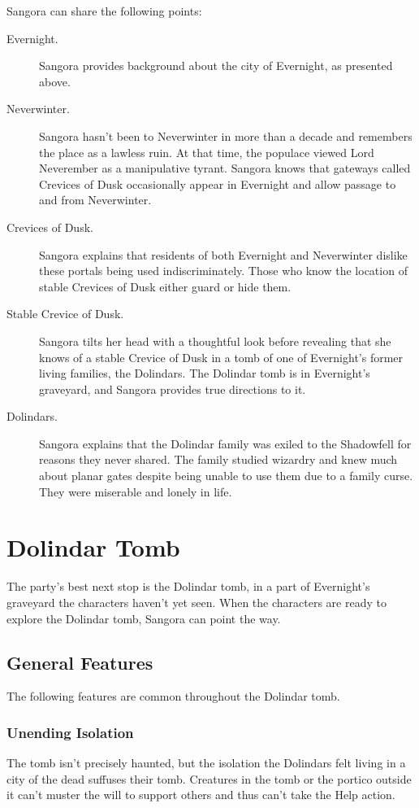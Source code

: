 \documentclass[10pt,a4paper,twoside,bg=print,twocolumn,openany,nodeprecatedcode]{dndbook}
\begin{document}
Sangora can share the following points:


\begin{description}
\item[Evernight.]
Sangora provides background about the city of Evernight, as presented above.
\item[Neverwinter.]
Sangora hasn't been to Neverwinter in more than a decade and remembers the place as a lawless ruin. At that time, the populace viewed Lord Neverember as a manipulative tyrant. Sangora knows that gateways called Crevices of Dusk occasionally appear in Evernight and allow passage to and from Neverwinter.
\item[Crevices of Dusk.]
Sangora explains that residents of both Evernight and Neverwinter dislike these portals being used indiscriminately. Those who know the location of stable Crevices of Dusk either guard or hide them.
\item[Stable Crevice of Dusk.]
Sangora tilts her head with a thoughtful look before revealing that she knows of a stable Crevice of Dusk in a tomb of one of Evernight's former living families, the Dolindars. The Dolindar tomb is in Evernight's graveyard, and Sangora provides true directions to it.
\item[Dolindars.]
Sangora explains that the Dolindar family was exiled to the Shadowfell for reasons they never shared. The family studied wizardry and knew much about planar gates despite being unable to use them due to a family curse. They were miserable and lonely in life.
\end{description}

\section{Dolindar Tomb}
The party's best next stop is the Dolindar tomb, in a part of Evernight's graveyard the characters haven't yet seen. When the characters are ready to explore the Dolindar tomb, Sangora can point the way.

\subsection{General Features}
The following features are common throughout the Dolindar tomb.

\subsubsection{Unending Isolation}
The tomb isn't precisely haunted, but the isolation the Dolindars felt living in a city of the dead suffuses their tomb. Creatures in the tomb or the portico outside it can't muster the will to support others and thus can't take the Help action.
\end{document}
